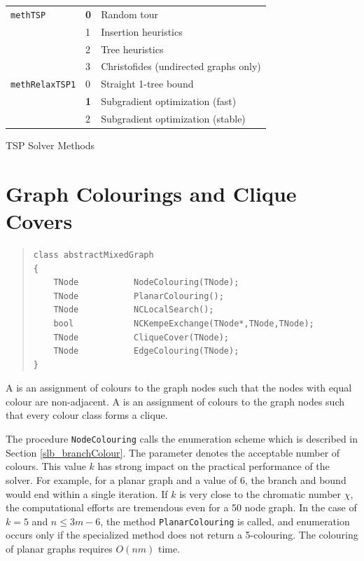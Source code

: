 \documentclass[a4paper,11pt,twoside]{book}
\begin{document}
\begin{multicols}{2}
\begin{tablehere}
\begin{center}
\vspace*{1cm}
\begin{tabular}{|l|l|l|}
\hline
\verb/methTSP/   & {\bf 0} & Random tour \\
                    & 1 & Insertion heuristics \\
                    & 2 & Tree heuristics \\
                    & 3 & Christofides (undirected graphs only) \\
\hline
\verb/methRelaxTSP1/   & 0 & Straight 1-tree bound \\
                    & {\bf 1} & Subgradient optimization (fast) \\
                    & 2 & Subgradient optimization (stable) \\
\hline
\end{tabular}
\end{center}
\caption{\label{tlb_methTSP}TSP Solver Methods}
\end{tablehere}



\section{Graph Colourings and Clique Covers}
\label{slb_solve_colours}
\methods
\begin{quote}
\begin{verbatim}
class abstractMixedGraph
{
    TNode           NodeColouring(TNode);
    TNode           PlanarColouring();
    TNode           NCLocalSearch();
    bool            NCKempeExchange(TNode*,TNode,TNode);
    TNode           CliqueCover(TNode);
    TNode           EdgeColouring(TNode);
}
\end{verbatim}
\end{quote}
A  is an assignment of colours to the graph nodes such that
the nodes with equal colour are non-adjacent. A  is an
assignment of colours to the graph nodes such that every colour class forms
a clique.

The procedure \verb/NodeColouring/ calls the enumeration scheme which is described
in Section \ref{slb_branchColour}. The parameter denotes the acceptable number of
colours. This value $k$ has strong impact on the practical performance of the
solver. For example, for a planar graph and a value of $6$, the branch and
bound would end within a single iteration. If $k$ is very close to the
chromatic number $\chi$, the computational efforts are tremendous even for a 50
node graph. In the case of $k=5$ and $n\leq 3m-6$, the method \verb/PlanarColouring/
is called, and enumeration occurs only if the specialized method does not return
a 5-colouring. The colouring of planar graphs requires $O(nm)$ time.


\end{multicols}
\end{document}
